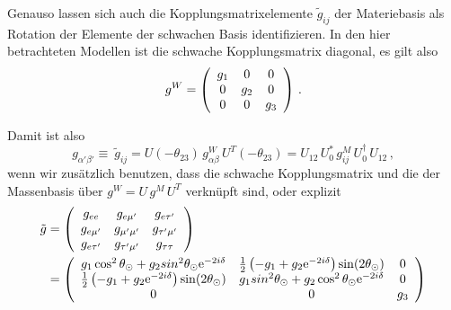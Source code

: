 Genauso lassen sich auch die Kopplungsmatrixelemente $\tilde{g}_{i j}$ der Materiebasis als Rotation der Elemente der schwachen Basis identifizieren.
In den hier betrachteten Modellen ist die schwache Kopplungsmatrix diagonal, es gilt also
\begin{equation}
    g^W = \left( \begin{array}{c c c}
        g_1         &   0     &     0   \\ 
        0           &   g_2   &     0   \\ 
        0           &   0     &     g_3  \\
    \end{array}\right) \,.
    \label{eq:schwachekopplung}
\end{equation}

Damit ist also
\begin{equation}
    g_{\alpha' \beta'} \equiv \ \tilde{g}_{i j} = U(-\theta_{2 3}) \, g^W_{\alpha \beta} \, U^T(-\theta_{2 3}) = U_{1 2} \, U^*_0 \, g^M_{i j} \, U^\dagger_0 \, U_{1 2} \,,
\end{equation}
wenn wir zusätzlich benutzen, dass die schwache Kopplungsmatrix und die der Massenbasis über $g^W = U \, g^M \, U^T$ verknüpft sind, oder explizit
\begin{align}
    \tilde{g} &= \left( \begin{array}{c c c}
        g_{ee}                  &   g_{e \mu'}          &     g_{e \tau'}       \\ 
        g_{e \mu'}              &   g_{\mu' \mu'}       &     g_{\tau' \mu'}    \\ 
        g_{e \tau'}             &   g_{\tau' \mu'}      &     g_{\tau \tau}     \\
    \end{array}\right) \nonumber\\
    &= \left( \begin{array}{c c c}
        g_1 \cos^2 \theta_\odot + g_2 sin^2 \theta_\odot \mathrm{e}^{-2 i \delta}                   &   \frac{1}{2} \left(-g_1 + g_2 \mathrm{e}^{-2 i \delta}\right) \sin(2 \theta_\odot)       &     0   \\ 
        \frac{1}{2} \left(-g_1 + g_2 \mathrm{e}^{-2 i \delta}\right) \sin(2 \theta_\odot)           &   g_1 sin^2 \theta_\odot + g_2 \cos^2 \theta_\odot\mathrm{e}^{-2 i \delta}                &     0   \\ 
        0                                                                                           &   0                                                                                       &     g_3  \\
    \end{array}\right)
    \label{eq:materiekoppmat}
\end{align}

